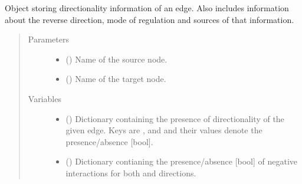 \documentclass[letterpaper,10pt,english]{sphinxmanual}
\begin{document}
\begin{fulllineitems}
\begin{fulllineitems}
\end{fulllineitems}


\begin{fulllineitems}
\label{\detokenize{main:pypath.main.PyPath.wang_effects}}
\end{fulllineitems}


\end{fulllineitems}


\begin{fulllineitems}
\label{\detokenize{main:pypath.main.Direction}}
Object storing directionality information of an edge. Also includes
information about the reverse direction, mode of regulation and
sources of that information.
\begin{quote}\begin{description}
\item[{Parameters}] \leavevmode\begin{itemize}
\item {} 
 () \textendash{} Name of the source node.

\item {} 
 () \textendash{} Name of the target node.

\end{itemize}

\item[{Variables}] \leavevmode\begin{itemize}
\item {} 
 () \textendash{} Dictionary containing the presence of directionality of the
given edge. Keys are ,  and 
and their values denote the presence/absence {[}bool{]}.

\item {} 
 () \textendash{} Dictionary contianing the presence/absence {[}bool{]} of negative
interactions for both  and 
directions.


\end{itemize}
\end{description}
\end{quote}
\end{fulllineitems}
\end{document}
